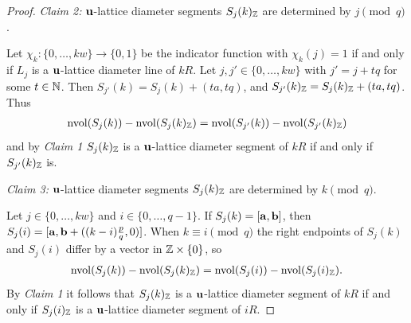 \begin{proof}
    \textit{Claim 2:} $\mathbf{u}$-lattice diameter segments $S_j(k)_{\mathbb{Z}}$ are determined by $j \pmod q$. 
    
    Let $\chi_k: \{0, \ldots, kw\} \to \{0,1\}$ be the indicator function with $\chi_k(j)=1$ if and only if $L_j$ is a $\mathbf{u}$-lattice diameter line of $kR$. Let $j,j' \in \{0, \ldots, kw\}$ with $j'= j+tq$ for some $t \in \mathbb{N}$. Then $S_{j'}(k) =S_j(k)+(ta,tq)$, and $S_{j'}(k)_{\mathbb{Z}} =S_j(k)_{\mathbb{Z}}+(ta,tq)$. Thus
    \begin{align*}
         \operatorname{nvol}(S_j(k))-\operatorname{nvol}(S_{j}(k)_{\mathbb{Z}})=\operatorname{nvol}(S_{j'}(k))-\operatorname{nvol}(S_{j'}(k)_{\mathbb{Z}})
    \end{align*}
    and by \textit{Claim 1} $S_j(k)_{\mathbb{Z}}$ is a $\mathbf{u}$-lattice diameter segment of $kR$ if and only if $S_{j'}(k)_{\mathbb{Z}}$ is.
    
    \textit{Claim 3:} $\mathbf{u}$-lattice diameter segments $S_j(k)_{\mathbb{Z}}$ are determined by $k \pmod q$.
    
    Let $j \in \{0, \ldots, kw\}$ and $i \in \{0, \ldots, q-1\}$. If $S_j(k) = [\mathbf{a},\mathbf{b}]$, then $S_j(i) = [\mathbf{a},\mathbf{b} + ((k-i)\frac{p}{q},0)]$. When $k \equiv i \pmod q$ the right endpoints of $S_j(k)$ and $S_j(i)$ differ by a vector in $\mathbb{Z} \times \{0\}$, so
    \begin{align*}
         \operatorname{nvol}(S_j(k))-\operatorname{nvol}(S_j(k)_{\mathbb{Z}})=\operatorname{nvol}(S_j(i))-\operatorname{nvol}(S_j(i)_{\mathbb{Z}}).
    \end{align*}
    By \textit{Claim 1} it follows that $S_j(k)_{\mathbb{Z}}$ is a $\mathbf{u}$-lattice diameter segment of $kR$ if and only if $S_j(i)_{\mathbb{Z}}$ is a $\mathbf{u}$-lattice diameter segment of $iR$.
    

\end{proof}
